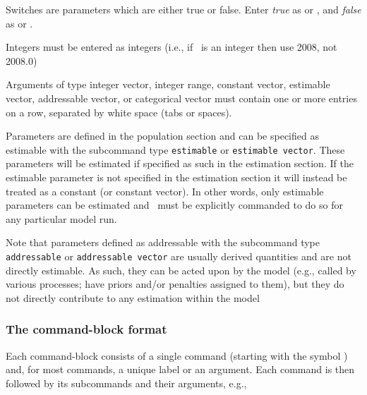 Switches are parameters which are either true or false. Enter \emph{true} as  or , and \emph{false} as  or .

Integers must be entered as integers (i.e., if \ is an integer then use 2008, not 2008.0)

Arguments of type integer vector, integer range, constant vector, estimable vector, addressable vector, or categorical vector must contain one or more entries on a row, separated by white space (tabs or spaces).

Parameters are defined in the population section and can be specified as estimable with the subcommand type \texttt{estimable} or \texttt{estimable vector}.  These parameters will be estimated if specified as such in the estimation section. If the estimable parameter is not specified in the estimation section it will instead be treated as a constant (or constant vector). In other words, only estimable parameters can be estimated and \CNAME\ must be explicitly commanded to do so for any particular model run.

Note that parameters defined as addressable with the subcommand type \texttt{addressable} or \texttt{addressable vector} are usually derived quantities and are not directly estimable. As such, they can be acted upon by the model (e.g., called by various processes; have priors and/or penalties assigned to them), but they do not directly contribute to any estimation within the model

\subsubsection{The command-block format}
Each command-block consists of a single command (starting with the symbol \command{}) and, for most commands, a unique label or an argument. Each command is then followed by its subcommands and their arguments, e.g.,

